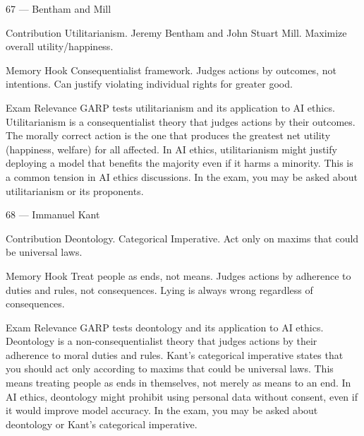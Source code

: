 \documentclass[aspectratio=169,8pt]{beamer}
\begin{document}
	\begin{frame}{67 --- Bentham and Mill}
		\begin{block}{Contribution}
			Utilitarianism. Jeremy Bentham and John Stuart Mill. Maximize overall utility/happiness.
		\end{block}
		\begin{block}{Memory Hook}
			Consequentialist framework. Judges actions by outcomes, not intentions. Can justify violating individual rights for greater good.
		\end{block}
		\begin{block}{Exam Relevance}
			GARP tests utilitarianism and its application to AI ethics. Utilitarianism is a consequentialist theory that judges actions by their outcomes. The morally correct action is the one that produces the greatest net utility (happiness, welfare) for all affected. In AI ethics, utilitarianism might justify deploying a model that benefits the majority even if it harms a minority. This is a common tension in AI ethics discussions. In the exam, you may be asked about utilitarianism or its proponents.
		\end{block}
	\end{frame}
	
	\begin{frame}{68 --- Immanuel Kant}
		\begin{block}{Contribution}
			Deontology. Categorical Imperative. Act only on maxims that could be universal laws.
		\end{block}
		\begin{block}{Memory Hook}
			Treat people as ends, not means. Judges actions by adherence to duties and rules, not consequences. Lying is always wrong regardless of consequences.
		\end{block}
		\begin{block}{Exam Relevance}
			GARP tests deontology and its application to AI ethics. Deontology is a non-consequentialist theory that judges actions by their adherence to moral duties and rules. Kant's categorical imperative states that you should act only according to maxims that could be universal laws. This means treating people as ends in themselves, not merely as means to an end. In AI ethics, deontology might prohibit using personal data without consent, even if it would improve model accuracy. In the exam, you may be asked about deontology or Kant's categorical imperative.
		\end{block}
	\end{frame}
	
\end{document}
